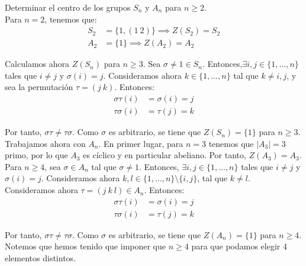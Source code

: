 \begin{ejercicio}
    Determinar el centro de los grupos $S_n$ y $A_n$ para $n\geq 2$.\\

    Para $n=2$, tenemos que:
    \begin{align*}
        S_2 &= \{1,(1\ 2)\} \implies Z(S_2) = S_2\\
        A_2 &= \{1\} \implies Z(A_2) = A_2
    \end{align*}

    Calculamos ahora $Z(S_n)$ para $n\geq 3$. Sea $\sigma\neq 1\in S_n$. Entonces,$\exists i,j\in \{1,\ldots,n\}$ tales que $i\neq j$ y $\sigma(i)=j$. Consideramos ahora $k\in \{1,\ldots,n\}$ tal que $k\neq i,j$, y sea la permutación $\tau = (j\ k)$. Entonces:
    \begin{align*}
        \sigma\tau(i) &= \sigma(i) = j\\
        \tau\sigma(i) &= \tau(j) = k
    \end{align*}

    Por tanto, $\sigma\tau\neq \tau\sigma$. Como $\sigma$ es arbitrario, se tiene que $Z(S_n)=\{1\}$ para $n\geq 3$.\\

    Trabajamos ahora con $A_n$. En primer lugar, para $n=3$ tenemos que $|A_3|=3$ primo, por lo que $A_3$ es cíclico y en particular abeliano. Por tanto, $Z(A_3)=A_3$.\\

    Para $n\geq 4$, sea $\sigma\in A_n$ tal que $\sigma\neq 1$. Entonces, $\exists i,j\in \{1,\ldots,n\}$ tales que $i\neq j$ y $\sigma(i)=j$. Consideramos ahora $k,l\in \{1,\ldots,n\}\setminus \{i,j\}$, tal que $k\neq l$. Consideramos ahora $\tau=(j\ k\ l)\in A_n$. Entonces:
    \begin{align*}
        \sigma\tau(i) &= \sigma(i) = j\\
        \tau\sigma(i) &= \tau(j) = k
    \end{align*}

    Por tanto, $\sigma\tau\neq \tau\sigma$. Como $\sigma$ es arbitrario, se tiene que $Z(A_n)=\{1\}$ para $n\geq 4$. Notemos que hemos tenido que imponer que $n\geq 4$ para que podamos elegir 4 elementos distintos.

\end{ejercicio}

